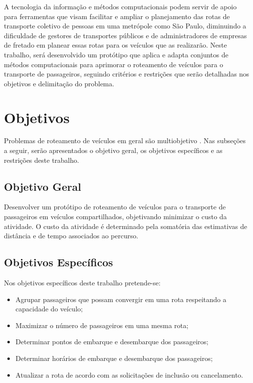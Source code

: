 A tecnologia da informação e métodos computacionais podem servir de apoio para ferramentas que visam facilitar e ampliar o planejamento das rotas de transporte coletivo de pessoas em uma metrópole como São Paulo, diminuindo a dificuldade de gestores de transportes públicos e de administradores de empresas de fretado em planear essas rotas para os veículos que as realizarão. Neste trabalho, será desenvolvido um protótipo que aplica e adapta conjuntos de métodos computacionais para aprimorar o roteamento de veículos para o transporte de passageiros, seguindo critérios e restrições que serão detalhadas nos objetivos e delimitação do problema.

\section{Objetivos}

Problemas de roteamento de veículos em geral são multiobjetivo \cite[p. 279]{goldbarg}.
Nas subseções a seguir, serão apresentados o objetivo geral, os objetivos específicos e as restrições deste trabalho. 

\subsection{Objetivo Geral}

Desenvolver um protótipo de roteamento de veículos para o transporte de passageiros em veículos compartilhados, objetivando minimizar o custo da atividade. O custo da atividade é determinado pela somatória das estimativas de distância e de tempo associados ao percurso. 

\subsection{Objetivos Específicos}
Nos objetivos específicos deste trabalho pretende-se:
\begin{itemize}
    
    \item Agrupar passageiros que possam convergir em uma rota respeitando a capacidade do veículo;
    
    \item Maximizar o número de passageiros em uma mesma rota;
    
    \item Determinar pontos de embarque e desembarque dos passageiros;
    
    \item Determinar horários de embarque e desembarque dos passageiros;
    
    \item Atualizar a rota de acordo com as solicitações de inclusão ou cancelamento.
    
\end{itemize}

